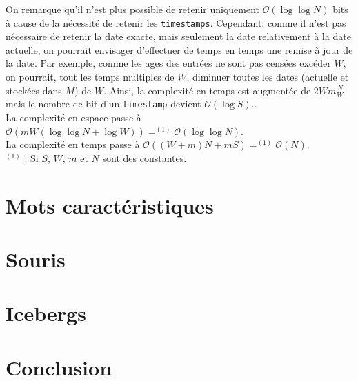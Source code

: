 \documentclass[12pt,a4paper,titlepage]{article}
\newcommand{\class}[1]{\texttt{#1}}
\begin{document}
On remarque qu'il n'est plus possible de retenir uniquement $\mathcal{O}(\log \log N)$ bits à cause de la nécessité de retenir les \class{timestamps}.
Cependant, comme il n'est pas nécessaire de retenir la date exacte, mais seulement la date relativement à la  date actuelle, on pourrait envisager d'effectuer de temps en temps une remise à jour de la date. Par exemple, comme les ages des entrées ne sont pas censées excéder $W$, on pourrait, tout les temps multiples de $W$, diminuer toutes les dates (actuelle et stockées dans $M$) de $W$. Ainsi, la complexité en temps est augmentée de $2Wm\frac{N}{W}$ mais le nombre de bit d'un \class{timestamp} devient $\mathcal{O}(\log S)$..\\
La complexité en espace passe à $\mathcal{O}(mW (\log \log N + \log W)) =^{(1)} \mathcal{O}(\log \log N)$.\\
La complexité en temps passe à $\mathcal{O}((W+m)N + mS) =^{(1)} \mathcal{O}(N)$.\\
$^{(1)}$ : Si $S$, $W$, $m$ et $N$ sont des constantes.

\newpage
\section{Mots caractéristiques}


\newpage
\section{Souris}


\newpage
\section{Icebergs}

\newpage
\section*{Conclusion}
\end{document}
